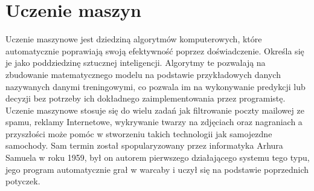 \chapter{Uczenie maszyn}
Uczenie maszynowe jest dziedziną algorytmów komputerowych, które automatycznie poprawiają swoją efektywność poprzez doświadczenie. 
Określa się je jako poddziedzinę sztucznej inteligencji. Algorytmy te pozwalają na zbudowanie matematycznego modelu na podstawie 
przykładowych danych nazywanych danymi treningowymi, co pozwala im na wykonywanie predykcji lub decyzji bez potrzeby ich dokładnego 
zaimplementowania przez programistę. Uczenie maszynowe stosuje się do wielu zadań jak filtrowanie poczty mailowej ze spamu, reklamy Internetowe, 
wykrywanie twarzy na zdjęciach oraz nagraniach a przyszłości może pomóc w stworzeniu takich technologii jak 
samojezdne samochody. Sam termin został spopularyzowany przez informatyka Arhura Samuela w roku 1959, był on autorem pierwszego działającego 
systemu tego typu, jego program automatycznie grał w warcaby i uczył się na podstawie poprzednich potyczek.
